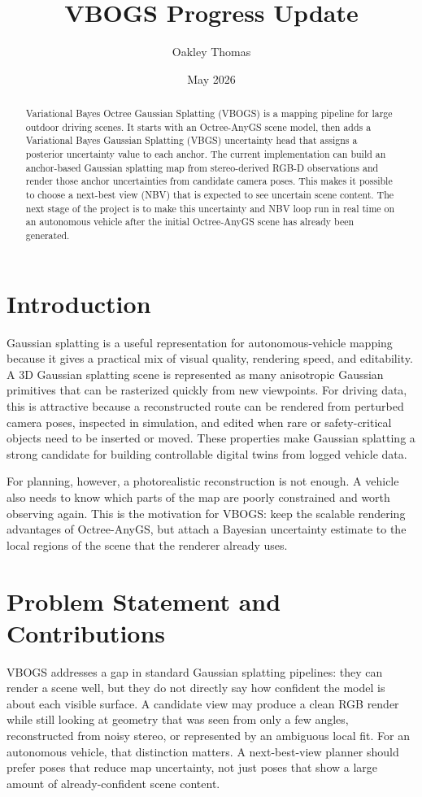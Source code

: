 \documentclass{article}
\title{VBOGS Progress Update}
\author{Oakley Thomas}
\date{May 2026}
\begin{document}
\maketitle
\begin{abstract}
Variational Bayes Octree Gaussian Splatting (VBOGS) is a mapping pipeline for large outdoor driving scenes. It starts with an Octree-AnyGS scene model, then adds a Variational Bayes Gaussian Splatting (VBGS) uncertainty head that assigns a posterior uncertainty value to each anchor. The current implementation can build an anchor-based Gaussian splatting map from stereo-derived RGB-D observations and render those anchor uncertainties from candidate camera poses. This makes it possible to choose a next-best view (NBV) that is expected to see uncertain scene content. The next stage of the project is to make this uncertainty and NBV loop run in real time on an autonomous vehicle after the initial Octree-AnyGS scene has already been generated.
\end{abstract}

\section{Introduction}
Gaussian splatting is a useful representation for autonomous-vehicle mapping because it gives a practical mix of visual quality, rendering speed, and editability. A 3D Gaussian splatting scene is represented as many anisotropic Gaussian primitives that can be rasterized quickly from new viewpoints. For driving data, this is attractive because a reconstructed route can be rendered from perturbed camera poses, inspected in simulation, and edited when rare or safety-critical objects need to be inserted or moved. These properties make Gaussian splatting a strong candidate for building controllable digital twins from logged vehicle data.

For planning, however, a photorealistic reconstruction is not enough. A vehicle also needs to know which parts of the map are poorly constrained and worth observing again. This is the motivation for VBOGS: keep the scalable rendering advantages of Octree-AnyGS, but attach a Bayesian uncertainty estimate to the local regions of the scene that the renderer already uses.

\section{Problem Statement and Contributions}
VBOGS addresses a gap in standard Gaussian splatting pipelines: they can render a scene well, but they do not directly say how confident the model is about each visible surface. A candidate view may produce a clean RGB render while still looking at geometry that was seen from only a few angles, reconstructed from noisy stereo, or represented by an ambiguous local fit. For an autonomous vehicle, that distinction matters. A next-best-view planner should prefer poses that reduce map uncertainty, not just poses that show a large amount of already-confident scene content.
\end{document}
